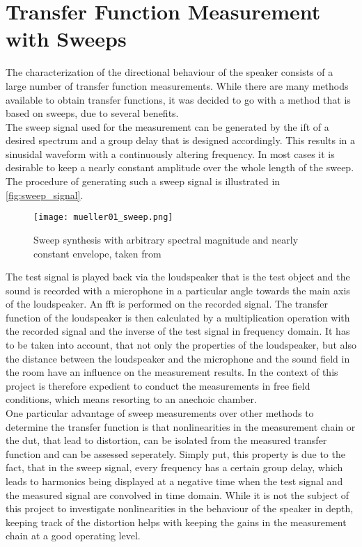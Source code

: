 \section{Transfer Function Measurement with Sweeps}\label{sec:sweep_theorie}
The characterization of the directional behaviour of the speaker consists of a large number of transfer function measurements. While there are many methods available to obtain transfer functions, it was decided to go with a method that is based on sweeps, due to several benefits. \citep[p. 3 ff.]{mueller01}\\
The sweep signal used for the measurement can be generated by the \gls{ift} of a desired spectrum and a group delay that is designed accordingly. This results in a sinusidal waveform with a continuously altering frequency. In most cases it is desirable to keep a nearly constant amplitude over the whole length of the sweep. The procedure of generating such a sweep signal is illustrated in \autoref{fig:sweep_signal}.

\begin{figure}[htbp]
	\centering
	\texttt{[image: mueller01\_sweep.png]}
	\caption{Sweep synthesis with arbitrary spectral magnitude and nearly constant envelope, taken from \citep{mueller01}}
		\label{fig:sweep_signal}
\end{figure}

The test signal is played back via the loudspeaker that is the test object and the sound is recorded with a microphone in a particular angle towards the main axis of the loudspeaker. An \gls{fft} is performed on the recorded signal. The transfer function of the loudspeaker is then calculated by a multiplication operation with the recorded signal and the inverse of the test signal in frequency domain. It has to be taken into account, that not only the properties of the loudspeaker, but also the distance between the loudspeaker and the microphone and the sound field in the room have an influence on the measurement results. In the context of this project is therefore expedient to conduct the measurements in free field conditions, which means resorting to an anechoic chamber.\\
One particular advantage of sweep measurements over other methods to determine the transfer function is that nonlinearities in the measurement chain or the \gls{dut}, that lead to distortion, can be isolated from the measured transfer function and can be assessed seperately. \citep[p. 20 f.]{mueller01} Simply put, this property is due to the fact, that in the sweep signal, every frequency has a certain group delay, which leads to harmonics being displayed at a negative time when the test signal and the measured signal are convolved in time domain. While it is not the subject of this project to investigate nonlinearities in the behaviour of the speaker in depth, keeping track of the distortion helps with keeping the gains in the measurement chain at a good operating level.

